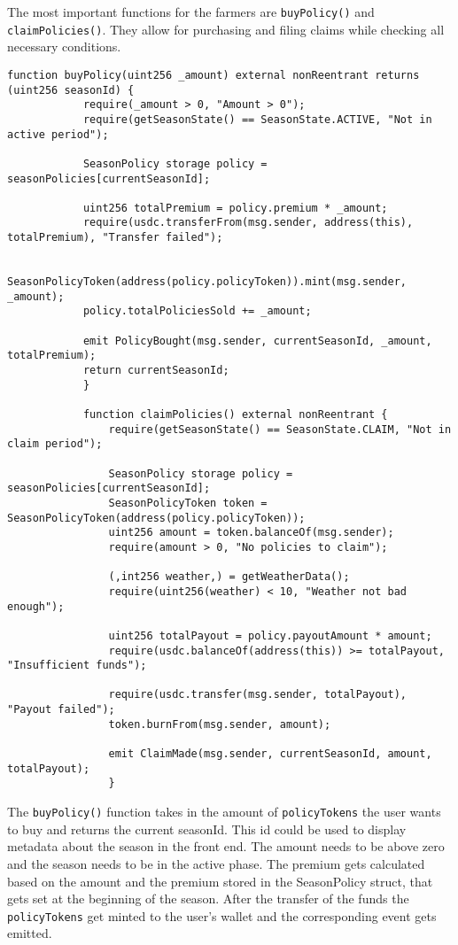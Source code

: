\documentclass[11pt,a4paper]{article}
\begin{document}
        \bigskip

		The most important functions for the farmers are \texttt{buyPolicy()} and \texttt{claimPolicies()}.
		They allow for purchasing and filing claims while checking all necessary conditions.

		\begin{lstlisting}[style=soliditystyle, caption={Excerpt: RainyDayFund.sol - Farmer Functions},label={lst:contract-claims}]
		function buyPolicy(uint256 _amount) external nonReentrant returns (uint256 seasonId) {
			require(_amount > 0, "Amount > 0");
			require(getSeasonState() == SeasonState.ACTIVE, "Not in active period");

			SeasonPolicy storage policy = seasonPolicies[currentSeasonId];

			uint256 totalPremium = policy.premium * _amount;
			require(usdc.transferFrom(msg.sender, address(this), totalPremium), "Transfer failed");

			SeasonPolicyToken(address(policy.policyToken)).mint(msg.sender, _amount);
			policy.totalPoliciesSold += _amount;

			emit PolicyBought(msg.sender, currentSeasonId, _amount, totalPremium);
			return currentSeasonId;
			}

			function claimPolicies() external nonReentrant {
				require(getSeasonState() == SeasonState.CLAIM, "Not in claim period");

				SeasonPolicy storage policy = seasonPolicies[currentSeasonId];
				SeasonPolicyToken token = SeasonPolicyToken(address(policy.policyToken));
				uint256 amount = token.balanceOf(msg.sender);
				require(amount > 0, "No policies to claim");

				(,int256 weather,) = getWeatherData();
				require(uint256(weather) < 10, "Weather not bad enough");

				uint256 totalPayout = policy.payoutAmount * amount;
				require(usdc.balanceOf(address(this)) >= totalPayout, "Insufficient funds");

				require(usdc.transfer(msg.sender, totalPayout), "Payout failed");
				token.burnFrom(msg.sender, amount);

				emit ClaimMade(msg.sender, currentSeasonId, amount, totalPayout);
				}
		\end{lstlisting}

		The \texttt{buyPolicy()} function takes in the amount of \texttt{policyTokens} the user wants to buy and returns the current seasonId.
		This id could be used to display metadata about the season in the front end.
		The amount needs to be above zero and the season needs to be in the active phase.
		The premium gets calculated based on the amount and the premium stored in the SeasonPolicy struct, that gets set at the beginning of the season.
		After the transfer of the funds the \texttt{policyTokens} get minted to the user's wallet and the corresponding event gets emitted.
\end{document}
